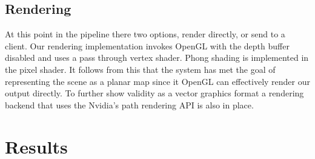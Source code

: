 \documentclass[review]{acmsiggraph}
\begin{document}
\subsection{Rendering}
At this point in the pipeline there two options, render directly, or send to a client. Our rendering implementation invokes OpenGL with the depth buffer disabled and uses a pass through vertex shader. Phong shading is implemented in the pixel shader. It follows from this that the system has met the goal of representing the scene as a planar map since it OpenGL can effectively render our output directly. To further show validity as a vector graphics format a rendering backend that uses the Nvidia’s path rendering API is also in place.

\section{Results}



 
\end{document}
